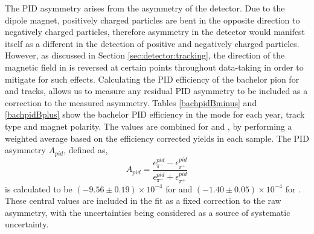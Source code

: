 The PID asymmetry arises from the asymmetry of the detector. Due to the \lhcb dipole magnet, positively charged particles are bent in the opposite direction to negatively charged particles, therefore asymmetry in the detector would manifest itself as a different in the detection of positive and negatively charged particles. However, as discussed in Section \ref{sec:detector:tracking}, the direction of the magnetic field in \lhcb is reversed at certain points throughout data-taking in order to mitigate for such effects. Calculating the PID efficiency of the bachelor pion for \Bp and \Bm tracks, allows us to measure any residual PID asymmetry to be included as a correction to the measured asymmetry. Tables \ref{bachpidBminus} and \ref{bachpidBplus} show the bachelor PID efficiency in the \kpi mode for each year, \KS track type and magnet polarity. The values are combined for \runone and \runtwo, by performing a weighted average based on the efficiency corrected yields in each sample. The PID asymmetry $A_{pid}$, defined as,
\begin{equation*}
A_{pid} = \frac{\epsilon_{\pi^-}^{pid} - \epsilon_{\pi^+}^{pid}}{\epsilon_{\pi^-}^{pid} + \epsilon_{\pi^+}^{pid}}
\end{equation*}
is calculated to be $(-9.56 \pm 0.19) \times 10^{-4}$ for \runone and $(-1.40 \pm 0.05) \times 10^{-4}$ for \runtwo. These central values are included in the \CP fit as a fixed correction to the raw asymmetry, with the uncertainties being considered as a source of systematic uncertainty.

